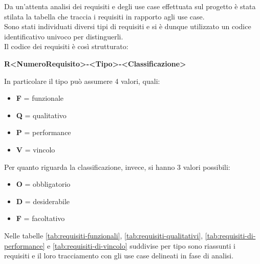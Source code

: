 \noindent Da un'attenta analisi dei requisiti e degli use case effettuata sul progetto è stata stilata la tabella che traccia i requisiti in rapporto agli use case.\\
Sono stati individuati diversi tipi di requisiti e si è dunque utilizzato un codice identificativo univoco per distinguerli.\\
Il codice dei requisiti è così strutturato:
\begin{center}
    \textbf{R<NumeroRequisito>-<Tipo>-<Classificazione>}
\end{center}
In particolare il tipo può assumere 4 valori, quali:
\begin{itemize}
    \item \textbf{F} = funzionale
    \item \textbf{Q} = qualitativo
    \item \textbf{P} = performance
    \item \textbf{V} = vincolo
\end{itemize}
Per quanto riguarda la classificazione, invece, si hanno 3 valori possibili:
\begin{itemize}
    \item \textbf{O} = obbligatorio
    \item \textbf{D} = desiderabile
    \item \textbf{F} = facoltativo
\end{itemize}
Nelle tabelle \ref{tab:requisiti-funzionali}, \ref{tab:requisiti-qualitativi}, \ref{tab:requisiti-di-performance} e \ref{tab:requisiti-di-vincolo} suddivise per tipo sono riassunti i requisiti e il loro tracciamento con gli use case delineati in fase di analisi.

\renewcommand{\arraystretch}{1.6}



